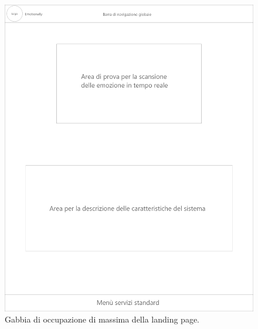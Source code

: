 \begin{figure}[H]
	\centering
	\caption{Gabbia di occupazione di massima della landing page.}
	\label{fig:gabbie-massima:landing-page}
	\includegraphics[width=\textwidth]{images/gabbie-di-massima/Landing}
\end{figure}

